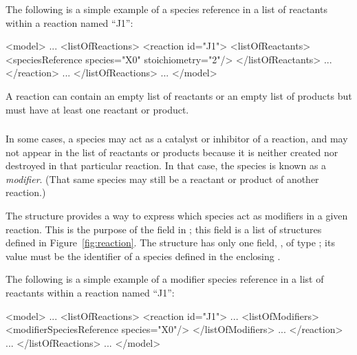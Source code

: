 \documentclass[10pt,twocolumntoc]{cekarticle}
\newcommand{\vref}[1]{\ref{#1}}
\begin{document}
The following is a simple example of a species reference in a list
of reactants within a reaction named ``J1'':
\begin{example}
<model>
    ...
    <listOfReactions>
        <reaction id="J1">
            <listOfReactants>
                <speciesReference species="X0" stoichiometry="2"/>
            </listOfReactants>
            ...
        </reaction>
        ...
    </listOfReactions>
    ...
</model>
\end{example}

A reaction can contain an empty list of reactants or an empty list
of products but must have at least one reactant or product.

\subsubsection{}
\label{subsec:modifierreference}

In some cases, a species may act as a catalyst or inhibitor of a reaction,
and may not appear in the list of reactants or products because it is
neither created nor destroyed in that particular reaction.  In that case,
the species is known as a \emph{modifier}.  (That same species may still be
a reactant or product of another reaction.)

The  structure provides a way to express which species act
as modifiers in a given reaction.  This is the purpose of the
 field in ; this field is a list of
 structures defined in
Figure~\vref{fig:reaction}.  The  structure
has only one field, , of type ; its value must
be the identifier of a species defined in the enclosing .

The following is a simple example of a modifier species reference in a list
of reactants within a reaction named ``J1'':
\begin{example}
<model>
    ...
    <listOfReactions>
        <reaction id="J1">
            ...
            <listOfModifiers>
                <modifierSpeciesReference species="X0"/>
            </listOfModifiers>
            ...
        </reaction>
        ...
    </listOfReactions>
    ...
</model>
\end{example}

\subsubsection{}
\label{subsec:kinetic-law}
\end{document}
